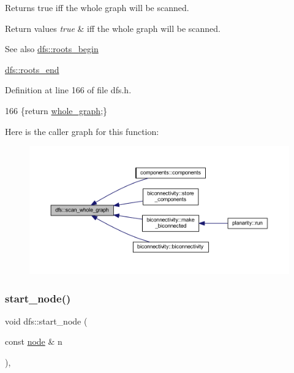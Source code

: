 Returns true iff the whole graph will be scanned. 


\begin{DoxyRetVals}{Return values}
{\em true} & iff the whole graph will be scanned. \\
\hline
\end{DoxyRetVals}
\begin{DoxySeeAlso}{See also}
\mbox{\hyperlink{classdfs_af56fa2b736f0b924dba1257e18ba4b61}{dfs\+::roots\+\_\+begin}} 

\mbox{\hyperlink{classdfs_ae1a61d8c2d8d99059cab410f766ec73f}{dfs\+::roots\+\_\+end}} 
\end{DoxySeeAlso}


Definition at line 166 of file dfs.\+h.


\begin{DoxyCode}
166 \{\textcolor{keywordflow}{return} \mbox{\hyperlink{classdfs_ab8342c80ab208ef0e0d781f0769d0d95}{whole\_graph}};\}
\end{DoxyCode}
Here is the caller graph for this function\+:
\nopagebreak
\begin{figure}[H]
\begin{center}
\leavevmode
\includegraphics[width=350pt]{classdfs_a025ed2d6101a7b9f72578a52b484ef50_icgraph}
\end{center}
\end{figure}
\mbox{\label{classdfs_aad21fd0d3036350fd341f877d5747852}} 
\subsubsection{\texorpdfstring{start\+\_\+node()}{start\_node()}\hspace{0.1cm}{\footnotesize\ttfamily [1/2]}}
{\footnotesize\ttfamily void dfs\+::start\+\_\+node (\begin{DoxyParamCaption}\item[{const \mbox{\hyperlink{classnode}{node}} \&}]{n }\end{DoxyParamCaption})\hspace{0.3cm}{\ttfamily [inline]}, {\ttfamily [inherited]}}



